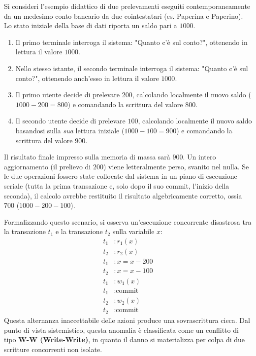 Si consideri l'esempio didattico di due prelevamenti eseguiti contemporaneamente da un medesimo conto bancario da due cointestatari (es. Paperina e Paperino).
Lo stato iniziale della base di dati riporta un saldo pari a $1000$.
\begin{enumerate}
    \item Il primo terminale interroga il sistema: "Quanto c'è sul conto?", ottenendo in lettura il valore $1000$.
    \item Nello stesso istante, il secondo terminale interroga il sistema: "Quanto c'è sul conto?", ottenendo anch'esso in lettura il valore $1000$.
    \item Il primo utente decide di prelevare $200$, calcolando localmente il nuovo saldo ($1000 - 200 = 800$) e comandando la scrittura del valore $800$.
    \item Il secondo utente decide di prelevare $100$, calcolando localmente il nuovo saldo basandosi sulla \textit{sua} lettura iniziale ($1000 - 100 = 900$) e comandando la scrittura del valore $900$.
\end{enumerate}

Il risultato finale impresso sulla memoria di massa sarà $900$. Un intero aggiornamento (il prelievo di $200$) viene letteralmente perso, svanito nel nulla.
Se le due operazioni fossero state collocate dal sistema in un piano di esecuzione seriale (tutta la prima transazione e, solo dopo il suo commit, l'inizio della seconda), il calcolo avrebbe restituito il risultato algebricamente corretto, ossia $700$ ($1000 - 200 - 100$).

Formalizzando questo scenario, si osserva un'esecuzione concorrente disastrosa tra la transazione $t_1$ e la transazione $t_2$ sulla variabile $x$:
\begin{align*}
    t_1&: r_1(x) \\
    t_2&: r_2(x) \\
    t_1&: x = x - 200 \\
    t_2&: x = x - 100 \\
    t_1&: w_1(x) \\
    t_1&: \text{commit} \\
    t_2&: w_2(x) \\
    t_2&: \text{commit}
\end{align*}
Questa alternanza inaccettabile delle azioni produce una sovrascrittura cieca. Dal punto di vista sistemistico, questa anomalia è classificata come un conflitto di tipo \textbf{W-W (Write-Write)}, in quanto il danno si materializza per colpa di due scritture concorrenti non isolate.

